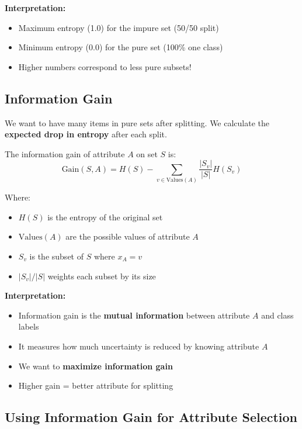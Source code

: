 \documentclass[11pt,a4paper]{article}
\theoremstyle{definition}
\theoremstyle{plain}
\theoremstyle{remark}
\begin{document}
\textbf{Interpretation:}
\begin{itemize}
    \item Maximum entropy (1.0) for the impure set (50/50 split)
    \item Minimum entropy (0.0) for the pure set (100\% one class)
    \item Higher numbers correspond to less pure subsets!
\end{itemize}

\subsection{Information Gain}

We want to have many items in pure sets after splitting. We calculate the \textbf{expected drop in entropy} after each split.

\begin{tcolorbox}[colback=purple!5!white,colframe=purple!75!black,title=\textbf{Information Gain Formula}]
The information gain of attribute \(A\) on set \(S\) is:
\[
\text{Gain}(S, A) = H(S) - \sum_{v \in \text{Values}(A)} \frac{|S_v|}{|S|} H(S_v)
\]

Where:
\begin{itemize}
    \item \(H(S)\) is the entropy of the original set
    \item \(\text{Values}(A)\) are the possible values of attribute \(A\)
    \item \(S_v\) is the subset of \(S\) where \(x_A = v\)
    \item \(|S_v| / |S|\) weights each subset by its size
\end{itemize}
\end{tcolorbox}

\textbf{Interpretation:}
\begin{itemize}
    \item Information gain is the \textbf{mutual information} between attribute \(A\) and class labels
    \item It measures how much uncertainty is reduced by knowing attribute \(A\)
    \item We want to \textbf{maximize information gain}
    \item Higher gain = better attribute for splitting
\end{itemize}

\subsection{Using Information Gain for Attribute Selection}
\end{document}
